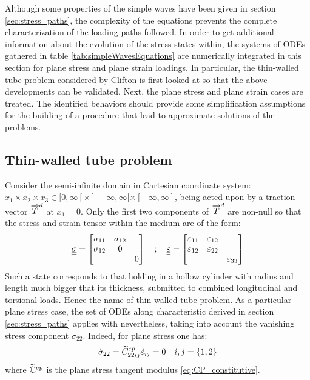 Although some properties of the simple waves have been given in section \ref{sec:stress_paths}, the complexity of the equations prevents the complete characterization of the loading paths followed.
In order to get additional information about the evolution of the stress states within, the systems of ODEs gathered in table \ref{tab:simpleWavesEquations} are numerically integrated in this section for plane stress and plane strain loadings.
In particular, the thin-walled tube problem considered by Clifton \cite{Clifton} is first looked at so that the above developments can be validated.
Next, the plane stress and plane strain cases are treated.
The identified behaviors should provide some simplification assumptions for the building of a procedure that lead to approximate solutions of the problems.

\subsection{Thin-walled tube problem}
Consider the semi-infinite domain in Cartesian coordinate system: $x_1 \times x_2 \times x_3 \in [0,\infty[ \times ]-\infty,\infty[ \times [-\infty,\infty]$, being acted upon by a traction vector ${\overrightarrow{T}}^d$ at $x_1=0$.
Only the first two components of ${\overrightarrow{T}}^d$ are non-null so that the stress and strain tensor within the medium are of the form:
\begin{equation}
  {\underline{\underline{\sigma}}} = \left[\begin{matrix}\sigma_{11} & \sigma_{12} & \\ \sigma_{12} & 0 & \\ & & 0\end{matrix}\right] \quad ;\quad{\underline{\underline{\varepsilon}}} = \left[\begin{matrix}\varepsilon_{11} & \varepsilon_{12} & \\ \varepsilon_{12} & \varepsilon_{22}& \\ & & \varepsilon_{33}\end{matrix}\right]
\end{equation}
Such a state corresponds to that holding in a hollow cylinder with radius and length much bigger that its thickness, submitted to combined longitudinal and torsional loads.
Hence the name of thin-walled tube problem. 
As a particular plane stress case, the set of ODEs along characteristic derived in section \ref{sec:stress_paths} applies with nevertheless, taking into account the vanishing stress component $\sigma_{22}$.
Indeed, for plane stress one has:
\begin{equation*}
  \dot{\sigma}_{22}=\widetilde{C}^{ep}_{22ij} \dot{\varepsilon}_{ij} =0 \quad i,j=\{1,2\}
\end{equation*}
where $\widetilde{\mathbb{C}}^{ep}$ is the plane stress tangent modulus \eqref{eq:CP_constitutive}.
